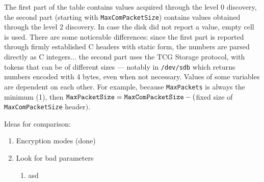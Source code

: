 The first part of the table contains values acquired through the level 0 discovery, the second part (starting with \verb|MaxComPacketSize|) contains values obtained through the level 2 discovery. In case the disk did not report a value, empty cell is used.
There are some noticeable differences: since the first part is reported through firmly established C headers with static form, the numbers are parsed directly as C integers... the second part uses the TCG Storage protocol, with tokens that can be of different sizes --- notably in \verb|/dev/sdb| which returns numbers encoded with 4 bytes, even when not necessary.
Values of some variables are dependent on each other. For example, because \verb|MaxPackets| is always the minimum (1), then $\verb|MaxPacketSize| = \verb|MaxComPacketSize| - ($fixed size of \verb|MaxComPacketSize| header$)$.



Ideas for comparison:
\begin{enumerate}
    \item Encryption modes (done)
    \item Look for bad parameters \begin{enumerate}
        \item asd
    \end{enumerate}
\end{enumerate}
